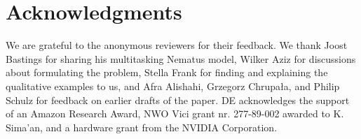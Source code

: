 \section*{Acknowledgments}
We are grateful to the anonymous reviewers for their feedback. We thank Joost Bastings for sharing his multitasking Nematus model, Wilker Aziz for discussions about formulating the problem, Stella Frank for finding and explaining the qualitative examples to us, and Afra Alishahi, Grzegorz Chrupała,
and Philip Schulz for feedback on earlier drafts of the paper. DE acknowledges the support of an Amazon Research Award, NWO Vici grant nr. 277-89-002 awarded to K. Sima’an, and a hardware grant from the NVIDIA Corporation.
